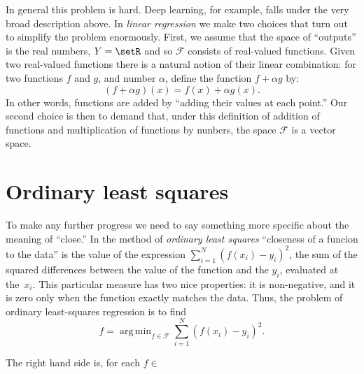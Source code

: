 \documentclass[10pt, a4paper]{article}
\DeclareMathOperator*{\argmin}{arg\,min}
\begin{document}
In general this problem is hard. Deep learning, for example, falls
under the very broad description above. In \emph{linear regression} we
make two choices that turn out to simplify the problem enormously.
First, we assume that the space of “outputs” is the real numbers, $Y =
\setR$ and so $\mathcal{F}$ consists of real-valued functions. Given two
real-valued functions there is a natural notion of their linear
combination: for two functions $f$ and $g$, and number $\alpha$, define the
function $f+\alpha g$ by:
\begin{equation*}
  (f+\alpha g)(x) = f(x) + \alpha g(x).
\end{equation*}
In other words, functions are added by “adding their values at each
point.” Our second choice is then to demand that, under this
definition of addition of functions and multiplication of functions by
nunbers, the space $\mathcal{F}$ is a vector space.

\section{Ordinary least squares}

To make any further progress we need to say something more specific
about the meaning of “close.” In the method of \emph{ordinary least
  squares} “closeness of a funcion to the data” is the value of the
expression $\sum_{i=1}^N{(f(x_i) - y_i)}^2$, the sum of the squared
differences between the value of the function and the $y_i$, evaluated
at the~$x_i$. This particular measure has two nice properties: it is
non-negative, and it is zero only when the function exactly matches
the data. Thus, the problem of ordinary least-squares regression is
to find
\[
  \hat{f} = \argmin_{f\in\mathcal{F}} \sum_{i=1}^N {(f(x_i) - y_i)}^2.
\]

The right hand side is, for each $f\in$
\end{document}
